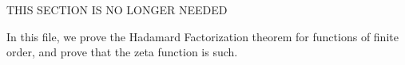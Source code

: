 

\makeatletter

\providecommand{\newleannode}[2]{%
  \expandafter\gdef\csname leannode@#1\endcsname{#2}}
\providecommand{\inputleannode}[1]{%
  \csname leannode@#1\endcsname}

\providecommand{\newleanmodule}[2]{%
  \expandafter\gdef\csname leanmodule@#1\endcsname{#2}}
\providecommand{\inputleanmodule}[1]{%
  \csname leanmodule@#1\endcsname}

\makeatother




\newleanmodule{PrimeNumberTheoremAnd.HadamardFactorization}{
THIS SECTION IS NO LONGER NEEDED

In this file, we prove the Hadamard Factorization theorem for functions of finite order,
and prove that the zeta function is such.
}